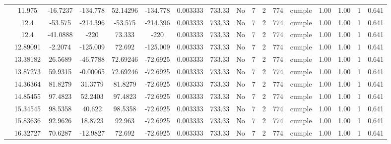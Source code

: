\begin{table}[H]
{\begin{tabular}{|c|c|c|c|c|c|c|c|c|c|c|c|c|c|c|c|c|}
\cline{2-17}    & 11.975 & -16.7237 & -134.778 & 52.14296 & -134.778 & 0.003333 & 733.33 & No  & 7   & 2   & 774 & \cellcolor[rgb]{ .776,  .937,  .808}cumple & 1.00 & 1.00 & 1   & 0.641 \bigstrut\\
\cline{2-17}    & \cellcolor[rgb]{ .851,  .882,  .949}12.4 & -53.575 & -214.396 & -53.575 & -214.396 & 0.003333 & 733.33 & No  & 7   & 2   & 774 & \cellcolor[rgb]{ .776,  .937,  .808}cumple & 1.00 & 1.00 & 1   & 0.641 \bigstrut\\
\cline{2-17}    & \cellcolor[rgb]{ .851,  .882,  .949}12.4 & -41.0888 & -220 & 73.333 & -220 & 0.003333 & 733.33 & No  & 7   & 2   & 774 & \cellcolor[rgb]{ .776,  .937,  .808}cumple & 1.00 & 1.00 & 1   & 0.641 \bigstrut\\
\cline{2-17}    & 12.89091 & -2.2074 & -125.009 & 72.692 & -125.009 & 0.003333 & 733.33 & No  & 7   & 2   & 774 & \cellcolor[rgb]{ .776,  .937,  .808}cumple & 1.00 & 1.00 & 1   & 0.641 \bigstrut\\
\cline{2-17}    & 13.38182 & 26.5689 & -46.7788 & 72.69246 & -72.6925 & 0.003333 & 733.33 & No  & 7   & 2   & 774 & \cellcolor[rgb]{ .776,  .937,  .808}cumple & 1.00 & 1.00 & 1   & 0.641 \bigstrut\\
\cline{2-17}    & 13.87273 & 59.9315 & -0.00065 & 72.69246 & -72.6925 & 0.003333 & 733.33 & No  & 7   & 2   & 774 & \cellcolor[rgb]{ .776,  .937,  .808}cumple & 1.00 & 1.00 & 1   & 0.641 \bigstrut\\
\cline{2-17}    & 14.36364 & 81.8279 & 31.3779 & 81.8279 & -72.6925 & 0.003333 & 733.33 & No  & 7   & 2   & 774 & \cellcolor[rgb]{ .776,  .937,  .808}cumple & 1.00 & 1.00 & 1   & 0.641 \bigstrut\\
\cline{2-17}    & 14.85455 & 97.4823 & 52.2403 & 97.4823 & -72.6925 & 0.003333 & 733.33 & No  & 7   & 2   & 774 & \cellcolor[rgb]{ .776,  .937,  .808}cumple & 1.00 & 1.00 & 1   & 0.641 \bigstrut\\
\cline{2-17}    & 15.34545 & 98.5358 & 40.622 & 98.5358 & -72.6925 & 0.003333 & 733.33 & No  & 7   & 2   & 774 & \cellcolor[rgb]{ .776,  .937,  .808}cumple & 1.00 & 1.00 & 1   & 0.641 \bigstrut\\
\cline{2-17}    & 15.83636 & 92.9626 & 18.8723 & 92.963 & -72.6925 & 0.003333 & 733.33 & No  & 7   & 2   & 774 & \cellcolor[rgb]{ .776,  .937,  .808}cumple & 1.00 & 1.00 & 1   & 0.641 \bigstrut\\
\cline{2-17}    & 16.32727 & 70.6287 & -12.9827 & 72.692 & -72.6925 & 0.003333 & 733.33 & No  & 7   & 2   & 774 & \cellcolor[rgb]{ .776,  .937,  .808}cumple & 1.00 & 1.00 & 1   & 0.641 \bigstrut\\

\end{tabular}}
\end{table}
